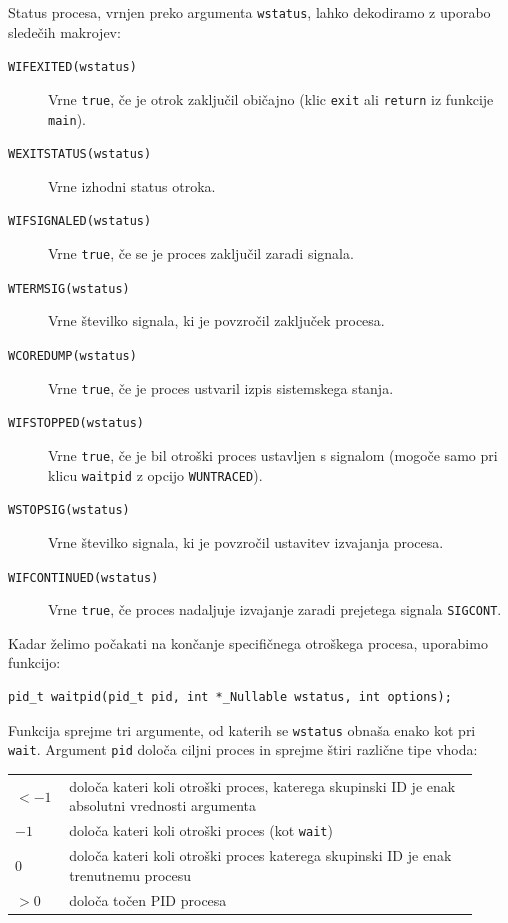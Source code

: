 \documentclass[a4paper,12pt,openright]{book}
\begin{document}
Status procesa, vrnjen preko argumenta \texttt{wstatus}, lahko dekodiramo z uporabo sledečih makrojev:
\begin{description}
	\item [\texttt{WIFEXITED(wstatus)}] Vrne \texttt{true}, če je otrok zaključil običajno (klic \texttt{exit} ali \texttt{return} iz funkcije \texttt{main}).
	\item [\texttt{WEXITSTATUS(wstatus)}] Vrne izhodni status otroka.
	\item [\texttt{WIFSIGNALED(wstatus)}] Vrne \texttt{true}, če se je proces zaključil zaradi signala.
	\item [\texttt{WTERMSIG(wstatus)}] Vrne številko signala, ki je povzročil zaključek procesa.
	\item [\texttt{WCOREDUMP(wstatus)}] Vrne \texttt{true}, če je proces ustvaril izpis sistemskega stanja.
	\item [\texttt{WIFSTOPPED(wstatus)}] Vrne \texttt{true}, če je bil otroški proces ustavljen s signalom (mogoče samo pri klicu \texttt{waitpid} z opcijo \texttt{WUNTRACED}).
	\item [\texttt{WSTOPSIG(wstatus)}] Vrne številko signala, ki je povzročil ustavitev izvajanja procesa.
	\item [\texttt{WIFCONTINUED(wstatus)}] Vrne \texttt{true}, če proces nadaljuje izvajanje zaradi prejetega signala \texttt{SIGCONT}.
\end{description}

Kadar želimo počakati na končanje specifičnega otroškega procesa, uporabimo funkcijo:
\begin{lstlisting}[style=func]
	pid_t waitpid(pid_t pid, int *_Nullable wstatus, int options);
\end{lstlisting}

Funkcija sprejme tri argumente, od katerih se \texttt{wstatus} obnaša enako kot pri \texttt{wait}.
Argument \texttt{pid} določa ciljni proces in sprejme štiri različne tipe vhoda:

\begin{tabular}{ p{0.1\linewidth} p{0.82\linewidth} }
	$< -1$ & določa kateri koli otroški proces, katerega skupinski ID je enak absolutni vrednosti argumenta \\
	$-1$   & določa kateri koli otroški proces (kot \texttt{wait})                                          \\
	$0$    & določa kateri koli otroški proces katerega skupinski ID je enak trenutnemu procesu             \\    
	$> 0$  & določa točen PID procesa                                                                       
\end{tabular}
\end{document}
